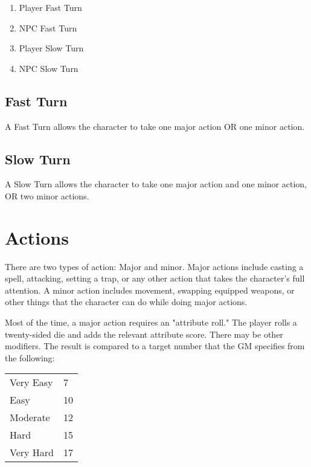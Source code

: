 \begin{multicols}{2}
\begin{enumerate}
  \item Player Fast Turn
  \item NPC Fast Turn
  \item Player Slow Turn
  \item NPC Slow Turn
\end{enumerate}

\subsection{Fast Turn}

A Fast Turn allows the character to take one major action OR
one minor action.

\subsection{Slow Turn}

A Slow Turn allows the character to take one major action and
one minor action, OR two minor actions.

\section{Actions}

There are two types of action: Major and minor. Major actions
include casting a spell, attacking, setting a trap, or any other
action that takes the character's full attention. A minor action
includes movement, swapping equipped weapons, or other things
that the character can do while doing major actions.

Most of the time, a major action requires an "attribute roll." The
player rolls a twenty-sided die and adds the relevant attribute
score. There may be other modifiers. The result is compared to
a target number that the GM specifies from the following:

\begin{center}
{
\begin{xtabular}{|l|l|}
Very Easy & 7 \\
Easy & 10 \\
Moderate & 12 \\
Hard & 15 \\
Very Hard & 17 \\
\hline
\end{xtabular}
}
\end{center}


\end{multicols}
